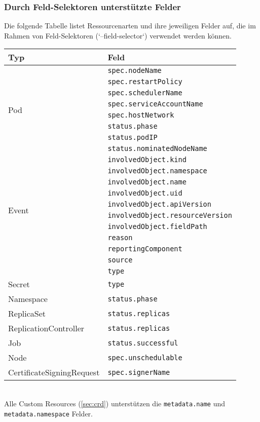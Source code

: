 \subsubsection{Durch Feld-Selektoren unterstützte Felder}
Die folgende Tabelle listet Ressourcenarten und ihre jeweiligen Felder auf, die im Rahmen von Feld-Selektoren (`--field-selector`) verwendet werden können.\\
\begin{table}[htbp]
\centering
\begin{tabular}{|p{}|p{}|}
\hline
\textbf{Typ} & \textbf{Feld} \\
\hline
\multirow{8}{*}{Pod} 
& \texttt{spec.nodeName} \\
& \texttt{spec.restartPolicy} \\
& \texttt{spec.schedulerName} \\
& \texttt{spec.serviceAccountName} \\
& \texttt{spec.hostNetwork} \\
& \texttt{status.phase} \\
& \texttt{status.podIP} \\
& \texttt{status.nominatedNodeName} \\
\hline
\multirow{10}{*}{Event}
& \texttt{involvedObject.kind} \\
& \texttt{involvedObject.namespace} \\
& \texttt{involvedObject.name} \\
& \texttt{involvedObject.uid} \\
& \texttt{involvedObject.apiVersion} \\
& \texttt{involvedObject.resourceVersion} \\
& \texttt{involvedObject.fieldPath} \\
& \texttt{reason} \\
& \texttt{reportingComponent} \\
& \texttt{source} \\
& \texttt{type} \\
\hline
Secret & \texttt{type} \\
\hline
Namespace & \texttt{status.phase} \\
\hline
ReplicaSet & \texttt{status.replicas} \\
\hline
ReplicationController & \texttt{status.replicas} \\
\hline
Job & \texttt{status.successful} \\
\hline
Node & \texttt{spec.unschedulable} \\
\hline
CertificateSigningRequest & \texttt{spec.signerName} \\
\hline
\end{tabular}
\label{tab:feldselektoren}
\end{table}\\
Alle Custom Resources (\ref{sec:crd}) unterstützen die \texttt{metadata.name} und \texttt{metadata.namespace} Felder.


